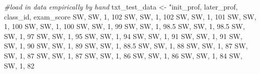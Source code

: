 \documentclass[
]{book}
\newenvironment{Shaded}{\begin{snugshade}}{\end{snugshade}}
\newcommand{\CommentTok}[1]{\textcolor[rgb]{0.56,0.35,0.01}{\textit{#1}}}
\newcommand{\NormalTok}[1]{#1}
\newcommand{\OtherTok}[1]{\textcolor[rgb]{0.56,0.35,0.01}{#1}}
\newcommand{\StringTok}[1]{\textcolor[rgb]{0.31,0.60,0.02}{#1}}
\begin{document}
\begin{Shaded}
\begin{Highlighting}[]
\CommentTok{\#load in data empirically by hand}
\NormalTok{txt\_test\_data }\OtherTok{\textless{}{-}} \StringTok{"init\_prof, later\_prof, class\_id, exam\_score}
\StringTok{ \textquotesingle{}SW\textquotesingle{}, \textquotesingle{}SW\textquotesingle{}, 1, 102}
\StringTok{ \textquotesingle{}SW\textquotesingle{}, \textquotesingle{}SW\textquotesingle{}, 1, 102}
\StringTok{ \textquotesingle{}SW\textquotesingle{}, \textquotesingle{}SW\textquotesingle{}, 1, 101}
\StringTok{ \textquotesingle{}SW\textquotesingle{}, \textquotesingle{}SW\textquotesingle{}, 1, 100}
\StringTok{ \textquotesingle{}SW\textquotesingle{}, \textquotesingle{}SW\textquotesingle{}, 1, 100}
\StringTok{ \textquotesingle{}SW\textquotesingle{}, \textquotesingle{}SW\textquotesingle{}, 1, 99}
\StringTok{ \textquotesingle{}SW\textquotesingle{}, \textquotesingle{}SW\textquotesingle{}, 1, 98.5}
\StringTok{ \textquotesingle{}SW\textquotesingle{}, \textquotesingle{}SW\textquotesingle{}, 1, 98.5}
\StringTok{ \textquotesingle{}SW\textquotesingle{}, \textquotesingle{}SW\textquotesingle{}, 1, 97}
\StringTok{ \textquotesingle{}SW\textquotesingle{}, \textquotesingle{}SW\textquotesingle{}, 1, 95}
\StringTok{ \textquotesingle{}SW\textquotesingle{}, \textquotesingle{}SW\textquotesingle{}, 1, 94}
\StringTok{ \textquotesingle{}SW\textquotesingle{}, \textquotesingle{}SW\textquotesingle{}, 1, 91}
\StringTok{ \textquotesingle{}SW\textquotesingle{}, \textquotesingle{}SW\textquotesingle{}, 1, 91}
\StringTok{ \textquotesingle{}SW\textquotesingle{}, \textquotesingle{}SW\textquotesingle{}, 1, 90}
\StringTok{ \textquotesingle{}SW\textquotesingle{}, \textquotesingle{}SW\textquotesingle{}, 1, 89}
\StringTok{ \textquotesingle{}SW\textquotesingle{}, \textquotesingle{}SW\textquotesingle{}, 1, 88.5}
\StringTok{ \textquotesingle{}SW\textquotesingle{}, \textquotesingle{}SW\textquotesingle{}, 1, 88}
\StringTok{ \textquotesingle{}SW\textquotesingle{}, \textquotesingle{}SW\textquotesingle{}, 1, 87}
\StringTok{ \textquotesingle{}SW\textquotesingle{}, \textquotesingle{}SW\textquotesingle{}, 1, 87}
\StringTok{ \textquotesingle{}SW\textquotesingle{}, \textquotesingle{}SW\textquotesingle{}, 1, 87}
\StringTok{ \textquotesingle{}SW\textquotesingle{}, \textquotesingle{}SW\textquotesingle{}, 1, 86}
\StringTok{ \textquotesingle{}SW\textquotesingle{}, \textquotesingle{}SW\textquotesingle{}, 1, 86}
\StringTok{ \textquotesingle{}SW\textquotesingle{}, \textquotesingle{}SW\textquotesingle{}, 1, 84}
\StringTok{ \textquotesingle{}SW\textquotesingle{}, \textquotesingle{}SW\textquotesingle{}, 1, 82}

\end{Highlighting}
\end{Shaded}
\end{document}
